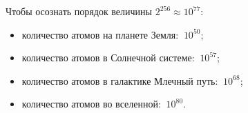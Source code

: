 \begin{frame}
    Чтобы осознать порядок величины $2^{256} \approx 10^{77}$:
    \begin{itemize}[label=*]
        \item количество атомов на планете Земля: $~ 10^{50}$;
        \item количество атомов в Солнечной системе: $~ 10^{57}$; 
        \item количество атомов в галактике Млечный путь: $~ 10^{68}$; 
        \item количество атомов во вселенной: $~ 10^{80}$.
    \end{itemize}

\end{frame}